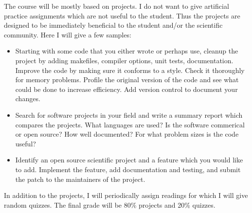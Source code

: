 \documentclass[12 pt]{article}
\begin{document}
The course will be mostly based on projects. I do not want to give
artificial practice assignments which are not useful to the
student. Thus the projects are designed to be immediately beneficial
to the student and/or the scientific community. Here I will give a few
samples:
\begin{itemize}
\item Starting with some code that you either wrote or perhaps use,
  cleanup the project by adding makefiles, compiler options, unit
  tests, documentation. Improve the code by making sure it conforms to
  a style. Check it thoroughly for memory problems. Profile the
  original version of the code and see what could be done to increase
  efficiency. Add version control to document your changes.
\item Search for software projects in your field and write a summary
  report which compares the projects. What languages are used? Is the
  software commerical or open source? How well documented? For what
  problem sizes is the code useful?
\item Identify an open source scientific project and a feature which
  you would like to add. Implement the feature, add documentation and
  testing, and submit the patch to the maintainers of the project.
\end{itemize}
In addition to the projects, I will periodically assign readings for
which I will give random quizzes. The final grade will be 80\%
projects and 20\% quizzes.

\clearpage
 
\end{document}
